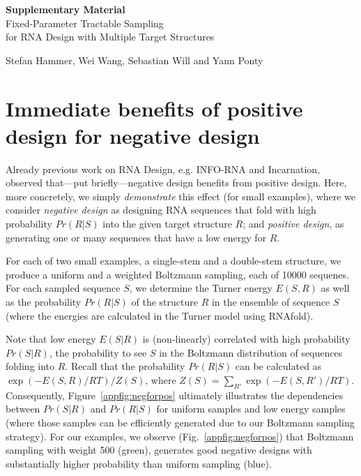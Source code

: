 \documentclass[10pt]{article}
\newcommand{\Def}[1]{\emph{#1}}
\begin{document}
\onecolumn

\appendix
{\centering \Large \textbf{Supplementary Material}\\[1em] Fixed-Parameter Tractable Sampling\\ for RNA Design with Multiple Target Structures\\%
}

\medskip
\begin{center}
\large Stefan Hammer, Wei Wang, Sebastian Will and Yann Ponty
\end{center}

\section{Immediate benefits of positive design for negative design}
\label{appsec:immediate-benefits-for-negative-design}
Already previous work on RNA Design, e.g. INFO-RNA and Incarnation, observed
that---put briefly---negative design benefits from positive design. Here, more
concretely, we simply \emph{demonstrate} this effect (for small examples), where
we consider \Def{negative design} as  
designing RNA sequences that fold with high probability $Pr(R|S)$ into the
given target structure $R$; and \Def{positive design}, as generating one or
many sequences that have a low energy for $R$.

For each of two small examples, a single-stem and a double-stem structure, we produce a uniform and a weighted Boltzmann
sampling, each of 10000 sequenes. For each sampled sequence $S$, we determine
the Turner energy $E(S,R)$ as well as the
probability $Pr(R|S)$ of the structure $R$ in the ensemble of sequence $S$ 
(where the energies are calculated in the Turner model using RNAfold). 

Note that low energy $E(S|R)$ is (non-linearly) correlated with high
probability $Pr(S|R)$, the probability to see $S$ in the Boltzmann distribution
of sequences folding into $R$. Recall that the probability $Pr(R|S)$ can be
calculated as $\exp(-E(S,R)/RT)/Z(S)$,
where $Z(S)=\sum_{R'} \exp(-E(S,R')/RT)$.
%
Consequently, Figure~\ref{appfig:negforpos} ultimately illustrates the dependencies
between $Pr(S|R)$ and $Pr(R|S)$ for uniform samples and low energy samples
(where those samples can be efficiently generated due to our Boltzmann sampling
strategy). For our examples, we observe (Fig.~\ref{appfig:negforpos}) that Boltzmann sampling with weight 500 (green), generates good negative designs 
with substantially higher probability than uniform sampling (blue).
\end{document}
